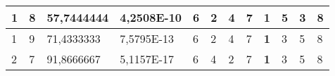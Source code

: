 \documentclass[conference]{IEEEtran}
\begin{document}
\begin{table*}[]
\begin{tabular}{|llll|llllllll|}
\multicolumn{1}{|l|}{1}                                                     & \multicolumn{1}{l|}{8}                                                        & \multicolumn{1}{l|}{57,7444444}                                                   & 4,2508E-10                     & \multicolumn{1}{l|}{6}                                                  & \multicolumn{1}{l|}{2}                                                  & \multicolumn{1}{l|}{4}                                                  & \multicolumn{1}{l|}{7}                                                  & \multicolumn{1}{l|}{\textbf{1}}                                         & \multicolumn{1}{l|}{5}                                                  & \multicolumn{1}{l|}{3}                                                  & 8                          \\ \hline
\multicolumn{1}{|l|}{1}                                                     & \multicolumn{1}{l|}{9}                                                        & \multicolumn{1}{l|}{71,4333333}                                                   & 7,5795E-13                     & \multicolumn{1}{l|}{6}                                                  & \multicolumn{1}{l|}{2}                                                  & \multicolumn{1}{l|}{4}                                                  & \multicolumn{1}{l|}{7}                                                  & \multicolumn{1}{l|}{\textbf{1}}                                         & \multicolumn{1}{l|}{3}                                                  & \multicolumn{1}{l|}{5}                                                  & 8                          \\ \hline
\multicolumn{1}{|l|}{2}                                                     & \multicolumn{1}{l|}{7}                                                        & \multicolumn{1}{l|}{91,8666667}                                                   & 5,1157E-17                     & \multicolumn{1}{l|}{6}                                                  & \multicolumn{1}{l|}{4}                                                  & \multicolumn{1}{l|}{2}                                                  & \multicolumn{1}{l|}{7}                                                  & \multicolumn{1}{l|}{\textbf{1}}                                         & \multicolumn{1}{l|}{3}                                                  & \multicolumn{1}{l|}{5}                                                  & 8                          \\ \hline

\end{tabular}
\end{table*}
\end{document}
